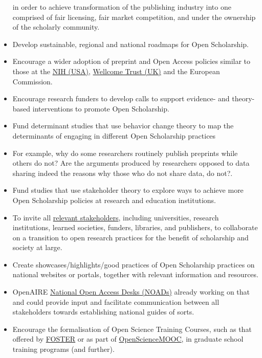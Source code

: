 \begin{itemize}
  in order to achieve transformation of the publishing industry into one
  comprised of fair licensing, fair market competition, and under the
  ownership of the scholarly community.
\item
  Develop sustainable, regional and national roadmaps for Open
  Scholarship.
\item
  Encourage a wider adoption of preprint and Open Access policies
  similar to those at the
  \href{https://publicaccess.nih.gov/policy.htm}{NIH (USA)},
  \href{https://wellcome.ac.uk/funding/guidance/open-access-policy}{Wellcome
  Trust (UK)} and the European Commission.
\item
  Encourage research funders to develop calls to support evidence- and
  theory-based interventions to promote Open Scholarship.
\item
  Fund determinant studies that use behavior change theory to map the
  determinants of engaging in different Open Scholarship practices
\item
  For example, why do some researchers routinely publish preprints while
  others do not? Are the arguments produced by researchers opposed to
  data sharing indeed the reasons why those who do not share data, do
  not?.
\item
  Fund studies that use stakeholder theory to explore ways to achieve
  more Open Scholarship policies at research and education institutions.
\item
  To invite all \href{https://doi.org/10.3233/ISU-170839}{relevant
  stakeholders}, including universities, research institutions, learned
  societies, funders, libraries, and publishers, to collaborate on a
  transition to open research practices for the benefit of scholarship
  and society at large.
\item
  Create showcases/highlights/good practices of Open Scholarship
  practices on national websites or portals, together with relevant
  information and resources.
\item
  OpenAIRE \href{https://www.openaire.eu/contact-noads}{National Open
  Access Desks (NOADs)} already working on that and could provide input
  and facilitate communication between all stakeholders towards
  establishing national guides of sorts.
\item
  Encourage the formalisation of Open Science Training Courses, such as
  that offered by
  \href{https://www.fosteropenscience.eu/toolkit}{FOSTER} or as part of
  \href{https://opensciencemooc.eu/}{OpenScienceMOOC}, in graduate
  school training programs (and further).
\end{itemize}

